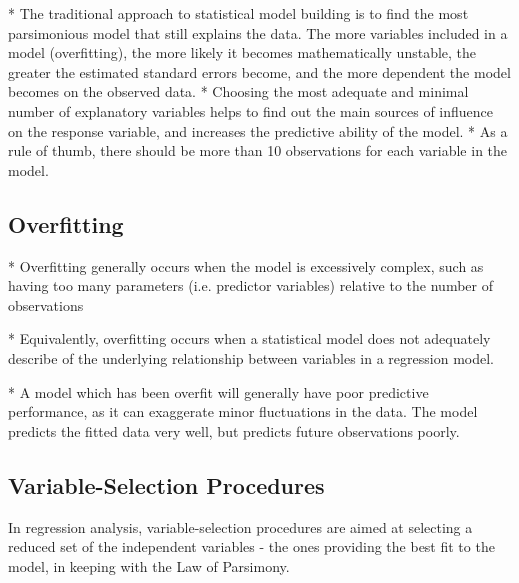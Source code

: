 *  The traditional approach to statistical model building is to find the most parsimonious model that still explains the data. The more variables included in a model (overfitting), the more likely it becomes mathematically unstable, the greater the estimated standard errors become, and the more dependent the model becomes on the observed data. *  Choosing the most adequate and minimal number of explanatory variables helps to find out the main sources of influence on the response variable, and increases the predictive ability of the model. 
*  As a rule of thumb, there should be more than 10 observations for each variable in the model.



\subsection*{Overfitting}

*  Overfitting generally occurs when the model is excessively complex, such as having too many parameters (i.e. predictor variables) relative to the number of observations

*  Equivalently, overfitting occurs when a statistical model does not adequately describe of the underlying relationship between variables in a regression model.

*  A model which has been overfit will generally have poor predictive performance, as it can exaggerate minor fluctuations in the data. The model predicts the fitted data very well, but predicts future observations poorly.




\subsection*{Variable-Selection Procedures}

In regression analysis, variable-selection procedures are aimed at selecting a reduced set of the independent variables - the ones providing the best fit to the model, in keeping with the Law of Parsimony.








